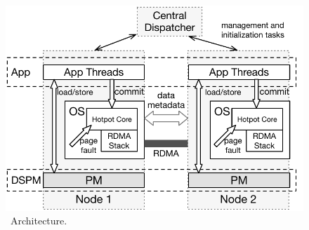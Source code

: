 {
\begin{figure}[t]
\begin{center}
\centerline{\includegraphics[width=\textwidth]{hotpot/Figures/architecture.pdf}}
\caption[\hotpot\ Architecture.]{\hotpot\ Architecture.}
\label{fig-hotpot-architecture}
\end{center}
\end{figure}
}
